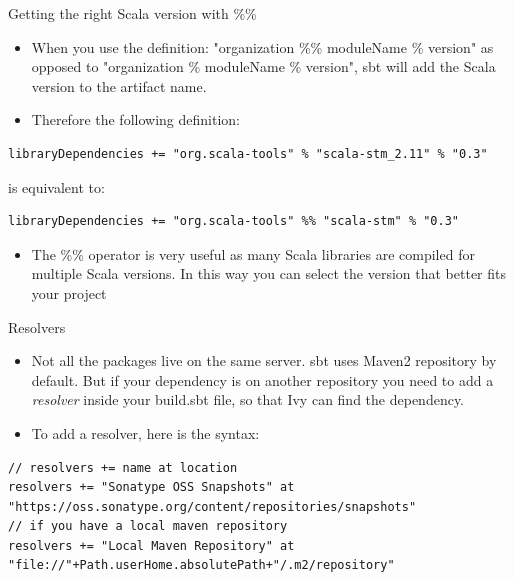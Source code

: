 \documentclass[presentation, aspectratio=169]{beamer}
\begin{document}
\begin{frame}[label={sec:org706b15e},fragile]{Getting the right Scala version with \%\%}
 \begin{itemize}
\item When you use the definition: "organization \%\% moduleName \% version" as opposed to "organization \% moduleName \% version",
sbt will add the Scala version to the artifact name.
\item Therefore the following definition:
\end{itemize}
\tiny
\begin{verbatim}
libraryDependencies += "org.scala-tools" % "scala-stm_2.11" % "0.3"
\end{verbatim}
\large
is equivalent to:
\tiny
\begin{verbatim}
libraryDependencies += "org.scala-tools" %% "scala-stm" % "0.3"
\end{verbatim}
\large
\begin{itemize}
\item The \%\% operator is very useful as many Scala libraries are compiled for multiple Scala versions. 
In this way you can select the version that better fits your project
\end{itemize}
\end{frame}
\begin{frame}[label={sec:org85e6ac2},fragile]{Resolvers}
 \begin{itemize}
\item Not all the packages live on the same server. sbt uses Maven2 repository by default. But if your dependency is 
on another repository you need to add a \emph{resolver} inside your build.sbt file, so that Ivy can find the dependency.

\item To add a resolver, here is the syntax:
\end{itemize}
\tiny
\begin{verbatim}
// resolvers += name at location
resolvers += "Sonatype OSS Snapshots" at "https://oss.sonatype.org/content/repositories/snapshots"
// if you have a local maven repository
resolvers += "Local Maven Repository" at "file://"+Path.userHome.absolutePath+"/.m2/repository"
\end{verbatim}
\end{frame}
\end{document}
